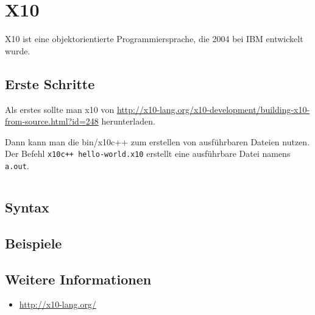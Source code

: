 \chapter{X10}%
X10 ist eine objektorientierte Programmiersprache, die 2004 bei IBM entwickelt
wurde.

\section{Erste Schritte}
Als erstes sollte man x10 von \url{http://x10-lang.org/x10-development/building-x10-from-source.html?id=248} herunterladen.

Dann kann man die bin/x10c++ zum erstellen von ausführbaren Dateien nutzen.
Der Befehl \texttt{x10c++ hello-world.x10} erstellt eine ausführbare Datei namens
\texttt{a.out}.

\inputminted[numbersep=5pt, tabsize=4, frame=lines, label=hello-world.x10]{cpp}{scripts/x10/hello-world.x10}

\section{Syntax}
\section{Beispiele}

\section{Weitere Informationen}
\begin{itemize}
    \item \url{http://x10-lang.org/}
\end{itemize}
